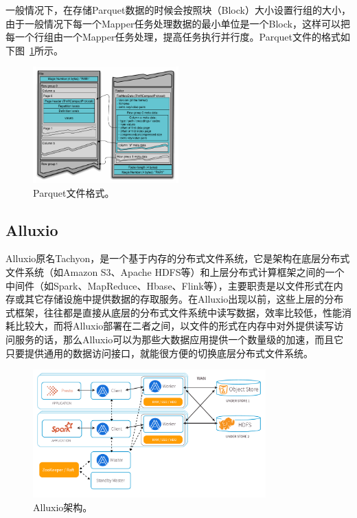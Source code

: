 \par 一般情况下，在存储Parquet数据的时候会按照块（Block）大小设置行组的大小，由于一般情况下每一个Mapper任务处理数据的最小单位是一个Block，这样可以把每一个行组由一个Mapper任务处理，提高任务执行并行度。Parquet文件的格式如下图~\ref{fig:parquet-file-layout}所示。

\begin{figure}[]
	\centering
	\includegraphics[width=0.5\textwidth]{img/simple-solution/FileLayout}
	
	\caption{Parquet文件格式。}
	\label{fig:parquet-file-layout}
\end{figure}

\subsection{Alluxio}

\par Alluxio原名Tachyon，是一个基于内存的分布式文件系统，它是架构在底层分布式文件系统（如Amazon S3、Apache HDFS等）和上层分布式计算框架之间的一个中间件（如Spark、MapReduce、Hbase、Flink等），主要职责是以文件形式在内存或其它存储设施中提供数据的存取服务。在Alluxio出现以前，这些上层的分布式框架，往往都是直接从底层的分布式文件系统中读写数据，效率比较低，性能消耗比较大，而将Alluxio部署在二者之间，以文件的形式在内存中对外提供读写访问服务的话，那么Alluxio可以为那些大数据应用提供一个数量级的加速，而且它只要提供通用的数据访问接口，就能很方便的切换底层分布式文件系统。

\begin{figure}[]
	\centering
	\includegraphics[width=0.8\textwidth]{img/simple-solution/alluxio-archi}
	
	\caption{Alluxio架构。}
	\label{fig:alluxio-archi}
\end{figure}

